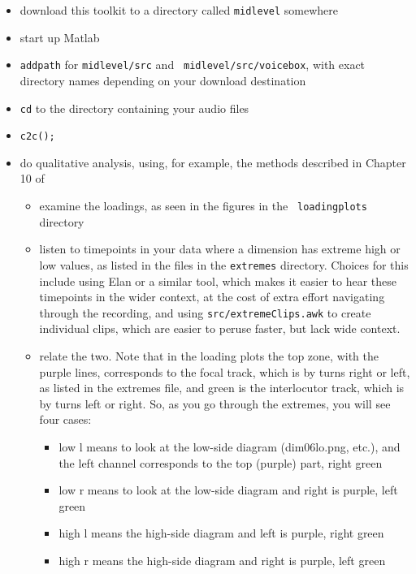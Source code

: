 \documentclass[11pt]{article}
\begin{document}
\begin{itemize}   \setlength{\itemsep}{0pt}\setlength{\parskip}{0pt}
\item download this toolkit to a directory called {\tt midlevel} somewhere 
\item start up Matlab
\item {\tt addpath} for {\tt midlevel/src} and {\tt
  midlevel/src/voicebox}, with 
  exact directory names depending on your download destination
\item {\tt cd} to the directory containing your audio files
\item {\tt c2c();}
\item do qualitative analysis, using, for example, the methods described in  Chapter 10 of \cite{me-cup}
  \begin{itemize}
\item examine the loadings, as seen in the figures in the {\tt
  loadingplots} directory
\item listen to timepoints in your data where a dimension has extreme
  high or low values, as listed in the files in the {\tt extremes}
  directory.  Choices for this include using Elan or a similar tool,
  which makes it easier to hear these timepoints in the wider context,
  at the cost of extra effort navigating through the recording, and
  using {\tt src/extremeClips.awk} to create individual clips, which
  are easier to peruse faster, but lack wide context.
  \item relate the two.  Note that in the loading plots the top zone,
    with the purple lines, corresponds to the focal track, which is by
    turns right or left, as listed in the extremes file, and green is
    the interlocutor track, which is by turns left or right.  So, as
    you go through the extremes, you will see  four cases:
    \begin{itemize}
\item low l means to look at the low-side diagram (dim06lo.png, etc.), and the left channel corresponds to the top (purple) part, right green
\item low r means to look at the low-side diagram and right is purple, left green
\item  high l means  the high-side diagram and left is purple, right green
\item  high r means the high-side diagram and right is purple, left green
\end{itemize}
\end{itemize}
\end{itemize}
\end{document}
